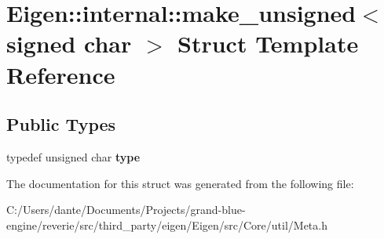 \hypertarget{struct_eigen_1_1internal_1_1make__unsigned_3_01signed_01char_01_4}{}\section{Eigen\+::internal\+::make\+\_\+unsigned$<$ signed char $>$ Struct Template Reference}
\label{struct_eigen_1_1internal_1_1make__unsigned_3_01signed_01char_01_4}
\subsection*{Public Types}
\begin{DoxyCompactItemize}
\item 
\mbox{\label{struct_eigen_1_1internal_1_1make__unsigned_3_01signed_01char_01_4_a41a4006127e242ae307ca36a6d1fee21}} 
typedef unsigned char {\bfseries type}
\end{DoxyCompactItemize}


The documentation for this struct was generated from the following file\+:\begin{DoxyCompactItemize}
\item 
C\+:/\+Users/dante/\+Documents/\+Projects/grand-\/blue-\/engine/reverie/src/third\+\_\+party/eigen/\+Eigen/src/\+Core/util/Meta.\+h\end{DoxyCompactItemize}
